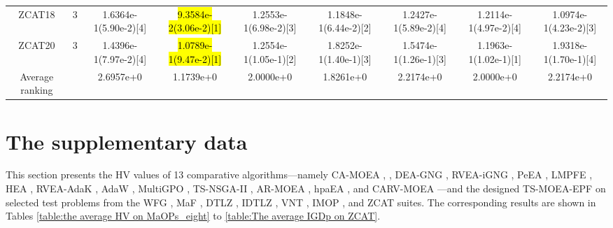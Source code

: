 \documentclass[a4paper,fleqn]{cas-dc}
\newcommand{\highlight}[1]{
	\begingroup
	\sethlcolor{Seashell}%
	\hl{#1}%
	\endgroup
}
\begin{document}
\begin{sloppypar}
\begin{table}[h]
{\begin{tabular}{ccccccccc}
				ZCAT18&3&1.6364e-1(5.90e-2)[4] &\highlight{9.3584e-2(3.06e-2)[1]}	&1.2553e-1(6.98e-2)[3]	&1.1848e-1(6.44e-2)[2]	&1.2427e-1(5.89e-2)[4]	&1.2114e-1(4.97e-2)[4]	&1.0974e-1(4.23e-2)[3]	\\
				
				ZCAT20&3&1.4396e-1(7.97e-2)[4] &\highlight{1.0789e-1(9.47e-2)[1]}	&1.2554e-1(1.05e-1)[2]	&1.8252e-1(1.40e-1)[3]	&1.5474e-1(1.26e-1)[3]	&1.1963e-1(1.02e-1)[1]	&1.9318e-1(1.70e-1)[4]	\\
				\hline
				Average ranking &~ &2.6957e+0 &1.1739e+0	  &2.0000e+0	&1.8261e+0	   &2.2174e+0	  &2.0000e+0	  &2.2174e+0	  \\
				\toprule[0.7pt]
			\end{tabular}
		}
	\end{table}

		

		\section{The supplementary data}\label{Sec:SupplementaryData}
		
		\par This section presents the HV values of 13 comparative algorithms—namely CA-MOEA \cite{CAMOEA}, , DEA-GNG \cite{DEA-GNG}, RVEA-iGNG \cite{RVEA-iGNG}, PeEA \cite{PeEA}, LMPFE \cite{LMPFE}, HEA \cite{HEA}, RVEA-AdaK \cite{AdaK}, AdaW \cite{AdaW}, MultiGPO \cite{MultiGPO}, TS-NSGA-II \cite{TS-NSGA-II}, AR-MOEA \cite{ARMOEA}, hpaEA \cite{hpaEA}, and CARV-MOEA \cite{CARVMOEA}—and the designed TS-MOEA-EPF on selected test problems from the WFG \cite{WFG}, MaF \cite{MaF},  DTLZ \cite{DTLZ},  IDTLZ \cite{IDTLZ}, VNT \cite{VNT}, IMOP \cite{IMOP},  and ZCAT \cite{IMOP} suites. The corresponding results are shown in Tables \ref{table:the average HV on MaOPs_eight} to \ref{table:The average IGDp on ZCAT}.
		\begin{table}[ht]
			\centering
			\caption{{HV values obtained by TS-MOEA-EPF and {7 of 13}  MaOEAs, where ``+'', ``-'', and ``='' respectively represent the comparison algorithms being superior, inferior, and equivalent to TS-MOEA-EPF (Part I)}}\label{table:the average HV on MaOPs_eight}
\end{table}
\end{sloppypar}
\end{document}
